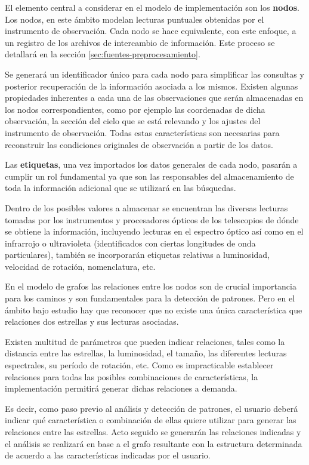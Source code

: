 	El elemento central a considerar en el modelo de implementación son los \textbf{nodos}. Los nodos, en este ámbito modelan lecturas puntuales obtenidas por el instrumento de observación. Cada nodo se hace equivalente, con este enfoque, a un registro de los archivos de intercambio de información. Este proceso se detallará en la sección \ref{sec:fuentes-preprocesamiento}.
	
	Se generará un identificador único para cada nodo para simplificar las consultas y posterior recuperación de la información asociada a los mismos. Existen algunas propiedades inherentes a cada una de las observaciones que serán almacenadas en los nodos correspondientes, como por ejemplo las coordenadas de dicha observación, la sección del cielo que se está relevando y los ajustes del instrumento de observación. Todas estas características son necesarias para reconstruir las condiciones originales de observación a partir de los datos.
	
	Las \textbf{etiquetas}, una vez importados los datos generales de cada nodo, pasarán a cumplir un rol fundamental ya que son las responsables del almacenamiento de toda la información adicional que se utilizará en las búsquedas.
	
	Dentro de los posibles valores a almacenar se encuentran las diversas lecturas tomadas por los instrumentos y procesadores ópticos de los telescopios de dónde se obtiene la información, incluyendo lecturas en el espectro óptico así como en el infrarrojo o ultravioleta (identificados con ciertas longitudes de onda particulares), también se incorporarán etiquetas relativas a luminosidad, velocidad de rotación, nomenclatura, etc.
	
	En el modelo de grafos las relaciones entre los nodos son de crucial importancia para los caminos y son fundamentales para la detección de patrones. Pero en el ámbito bajo estudio hay que reconocer que no existe una única característica que relaciones dos estrellas y sus lecturas asociadas.
	
	Existen multitud de parámetros que pueden indicar relaciones, tales como la distancia entre las estrellas, la luminosidad, el tamaño, las diferentes lecturas espectrales, su período de rotación, etc. Como es impracticable establecer relaciones para todas las posibles combinaciones de características, la implementación permitirá generar dichas relaciones a demanda.
	
	Es decir, como paso previo al análisis y detección de patrones, el usuario deberá indicar qué característica o combinación de ellas quiere utilizar para generar las relaciones entre las estrellas. Acto seguido se generarán las relaciones indicadas y el análisis se realizará en base a el grafo resultante con la estructura determinada de acuerdo a las características indicadas por el usuario.
	
